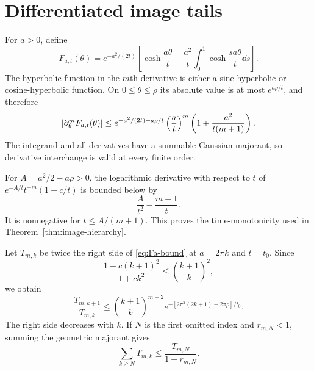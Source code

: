 \section{Differentiated image tails}\label{app:image-tails}

For $a>0$, define
\[
F_{a,t}(\theta)=e^{-a^2/(2t)}
\left[\cosh\frac{a\theta}{t}
-\frac{a^2}{t}\int_0^1\cosh\frac{sa\theta}{t}\dd s\right].
\]
The hyperbolic function in the $m$th derivative is either a sine-hyperbolic
or cosine-hyperbolic function.  On $0\le\theta\le\rho$ its absolute value is
at most $e^{a\rho/t}$, and therefore
\begin{equation}\label{eq:Fa-bound}
\left|\partial_\theta^mF_{a,t}(\theta)\right|
\le e^{-a^2/(2t)+a\rho/t}\left(\frac at\right)^m
\left(1+\frac{a^2}{t(m+1)}\right).
\end{equation}
The integrand and all derivatives have a summable Gaussian majorant, so
derivative interchange is valid at every finite order.

For $A=a^2/2-a\rho>0$, the logarithmic derivative with respect to $t$ of
$e^{-A/t}t^{-m}(1+c/t)$ is bounded below by
\[
\frac{A}{t^2}-\frac{m+1}{t}.
\]
It is nonnegative for $t\le A/(m+1)$.  This proves the time-monotonicity used
in Theorem~\ref{thm:image-hierarchy}.

Let $T_{m,k}$ be twice the right side of \eqref{eq:Fa-bound} at
$a=2\pi k$ and $t=t_0$.  Since
\[
\frac{1+c(k+1)^2}{1+ck^2}\le\left(\frac{k+1}{k}\right)^2,
\]
we obtain
\[
\frac{T_{m,k+1}}{T_{m,k}}
\le\left(\frac{k+1}{k}\right)^{m+2}
e^{-[2\pi^2(2k+1)-2\pi\rho]/t_0}.
\]
The right side decreases with $k$.  If $N$ is the first omitted index and
$r_{m,N}<1$, summing the geometric majorant gives
\[
\sum_{k\ge N}T_{m,k}\le\frac{T_{m,N}}{1-r_{m,N}}.
\]
